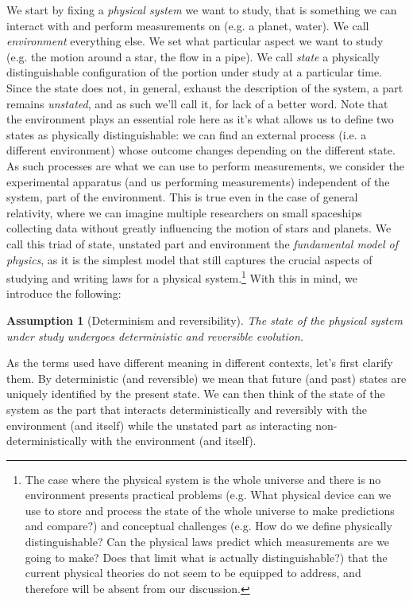 \documentclass[aps,pra,10pt,twocolumn,floatfix,nofootinbib]{revtex4-1}
\newtheorem{assump}{Assumption}
\theoremstyle{definition}
\begin{document}
We start by fixing a \emph{physical system} we want to study, that is something we can interact with and perform measurements on (e.g. a planet, water). We call \emph{environment} everything else. We set what particular aspect we want to study (e.g. the motion around a star, the flow in a pipe). We call \emph{state} a physically distinguishable configuration of the portion under study at a particular time. Since the state does not, in general, exhaust the description of the system, a part remains \emph{unstated}, and as such we'll call it, for lack of a better word. Note that the environment plays an essential role here as it's what allows us to define two states as physically distinguishable: we can find an external process (i.e. a different environment) whose outcome changes depending on the different state. As such processes are what we can use to perform measurements, we consider the experimental apparatus (and us performing measurements) independent of the system, part of the environment. This is true even in the case of general relativity, where we can imagine multiple researchers on small spaceships collecting data without greatly influencing the motion of stars and planets. We call this triad of state, unstated part and environment the \emph{fundamental model of physics}, as it is the simplest model that still captures the crucial aspects of studying and writing laws for a physical system.\footnote{The case where the physical system is the whole universe and there is no environment presents practical problems (e.g. What physical device can we use to store and process the state of the whole universe to make predictions and compare?) and conceptual challenges (e.g. How do we define physically distinguishable? Can the physical laws predict which measurements are we going to make? Does that limit what is actually distinguishable?) that the current physical theories do not seem to be equipped to address, and therefore will be absent from our discussion.} With this in mind, we introduce the following:

\begin{assump}[Determinism and reversibility]
The state of the physical system under study undergoes deterministic and reversible evolution.
\end{assump}

As the terms used have different meaning in different contexts, let's first clarify them. By deterministic (and reversible) we mean that future (and past) states are uniquely identified by the present state. We can then think of the state of the system as the part that interacts deterministically and reversibly with the environment (and itself) while the unstated part as interacting non-deterministically with the environment (and itself).
\end{document}

